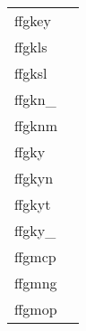 \documentclass[11pt]{book}
\begin{document}
\begin{tabular}{lr}
ffgkey      & \pageref{ffgkey} \\
ffgkls  & \pageref{ffgkls} \\
ffgksl  & \pageref{ffgksl} \\
ffgkn\_     & \pageref{ffgknx} \\
ffgknm    & \pageref{ffgknm} \\
ffgky          & \pageref{ffgky} \\
ffgkyn         & \pageref{ffgkyn} \\
ffgkyt   & \pageref{ffgkyt} \\
ffgky\_      & \pageref{ffgkyx} \\
ffgmcp   & \pageref{ffgmcp} \\
ffgmng  & \pageref{ffgmng} \\
ffgmop    & \pageref{ffgmop} \\

\end{tabular}
\end{document}
